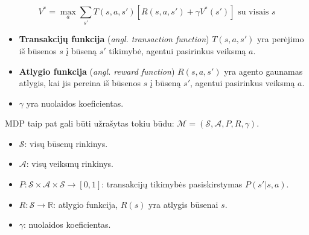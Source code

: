 \documentclass{VUMIFPSbakalaurinis}
\begin{document}
{	\begin{equation}\label{eq:bellmanOptimal}
		V^* = \max_a \sum_{s'}T(s, a, s')[R(s, a, s') + \gamma V^*(s')] \textrm{ su visais } s
	\end{equation} 
	
	\begin{itemize}
		\item \textbf{Transakcijų funkcija} (\textit{angl. transaction function}) \(T(s, a, s')\) yra perėjimo iš būsenos \(s\) į būseną \(s'\) tikimybė, agentui pasirinkus veiksmą \(a\).
		\item \textbf{Atlygio funkcija} (\textit{angl. reward function}) \(R(s, a, s')\) yra agento gaunamas atlygis, kai jis pereina iš būsenos \(s\) į būseną \(s'\), agentui pasirinkus veiksmą \(a\).
		\item \(\gamma\) yra nuolaidos koeficientas.
	\end{itemize}\par

	MDP taip pat gali būti užrašytas tokiu būdu: \(\mathcal{M} = (\mathcal{S}, \mathcal{A}, P, R, \gamma)\).
	\begin{itemize}
		\item \(\mathcal{S}\): visų būsenų rinkinys.
		\item \(\mathcal{A}\): visų veiksmų rinkinys.
		\item \(P : \mathcal{S} \times \mathcal{A} \times \mathcal{S} \rightarrow [0, 1]\): transakcijų tikimybės pasiskirstymas \(P(s'|s, a)\).
		\item \(R : \mathcal{S} \rightarrow \mathbb{R}\): atlygio funkcija, \(R(s)\) yra atlygis būsenai \(s\).
		\item \(\gamma\): nuolaidos koeficientas.
	\end{itemize}
}
\end{document}
